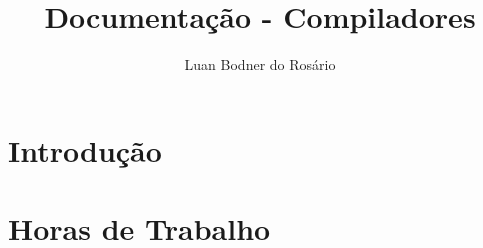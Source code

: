 \documentclass[12pt,a4paper,final]{report}
\author{Luan Bodner do Rosário}
\title{Documentação - Compiladores}
\begin{document}
\maketitle
\section*{Introdução}
\section*{Horas de Trabalho}
\end{document}

